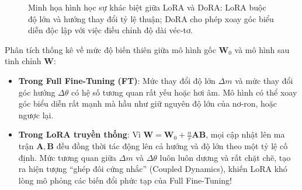 \begin{figure}[ht]
\centering
{}
\caption{Minh họa hình học sự khác biệt giữa LoRA và DoRA: LoRA buộc độ lớn và hướng thay đổi tỷ lệ thuận; DoRA cho phép xoay góc biểu diễn độc lập với việc điều chỉnh độ dài véc-tơ.}
\label{fig:dora-geometric-intuition}
\end{figure}

Phân tích thống kê về mức độ biến thiên giữa mô hình gốc $\mathbf{W}_0$ và mô hình sau tinh chỉnh $\mathbf{W}$:
\begin{itemize}
  \item \textbf{Trong Full Fine-Tuning (FT)}: Mức thay đổi độ lớn $\Delta m$ và mức thay đổi góc hướng $\Delta \theta$ có hệ số tương quan rất yếu hoặc hơi âm. Mô hình có thể xoay góc biểu diễn rất mạnh mà hầu như giữ nguyên độ lớn của nơ-ron, hoặc ngược lại.
  \item \textbf{Trong LoRA truyền thống}: Vì $\mathbf{W} = \mathbf{W}_0 + \frac{\alpha}{r} \mathbf{A}\mathbf{B}$, mọi cập nhật lên ma trận $\mathbf{A}, \mathbf{B}$ đều đồng thời tác động lên cả hướng và độ lớn theo một tỷ lệ cố định. Mức tương quan giữa $\Delta m$ và $\Delta \theta$ luôn luôn dương và rất chặt chẽ, tạo ra hiện tượng ``ghép đôi cứng nhắc'' (Coupled Dynamics), khiến LoRA khó lòng mô phỏng các biến đổi phức tạp của Full Fine-Tuning!
\end{itemize}

